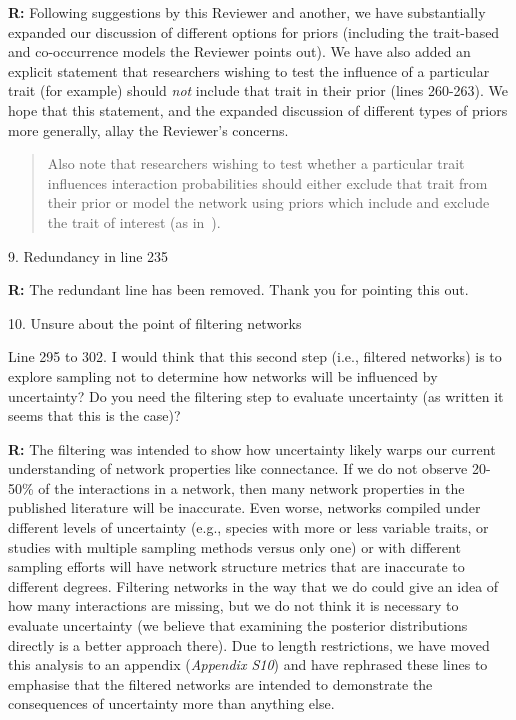 \documentclass[12pt]{letter}
\newenvironment{refquote}{\bigskip \begin{it}}{\end{it}\smallskip}
\begin{document}
		\textbf{R:} Following suggestions by this Reviewer and another, we have substantially expanded our discussion of different options for priors (including the trait-based and co-occurrence models the Reviewer points out). We have also added an explicit statement that researchers wishing to test the influence of a particular trait (for example) should \emph{not} include that trait in their prior (lines 260-263). We hope that this statement, and the expanded discussion of different types of priors more generally, allay the Reviewer's concerns. 


		\begin{quotation}
			Also note that researchers wishing to test whether a particular trait influences interaction probabilities should either exclude that trait from their prior or model the network using priors which include and exclude the trait of interest (as in~\citet{Weinstein2017,Weinstein2017a}).
		\end{quotation}


	9. Redundancy in line 235


		\textbf{R:} The redundant line has been removed. Thank you for pointing this out.


	10. Unsure about the point of filtering networks 


		\begin{refquote}
		Line 295 to 302.  I would think that this second step (i.e., filtered networks) is to explore sampling not to determine how networks will be influenced by uncertainty?  Do you need the filtering step to evaluate uncertainty (as written it seems that this is the case)?
		\end{refquote}


		\textbf{R:} The filtering was intended to show how uncertainty likely warps our current understanding of network properties like connectance. If we do not observe 20-50\% of the interactions in a network, then many network properties in the published literature will be inaccurate. Even worse, networks compiled under different levels of uncertainty (e.g., species with more or less variable traits, or studies with multiple sampling methods versus only one) or with different sampling efforts will have network structure metrics that are inaccurate to different degrees. Filtering networks in the way that we do could give an idea of how many interactions are missing, but we do not think it is necessary to evaluate uncertainty (we believe that examining the posterior distributions directly is a better approach there). Due to length restrictions, we have moved this analysis to an appendix (\emph{Appendix S10}) and have rephrased these lines to emphasise that the filtered networks are intended to demonstrate the consequences of uncertainty more than anything else.
\end{document}
